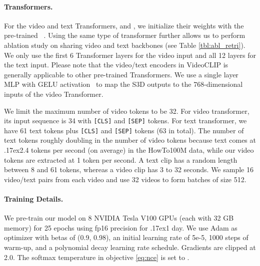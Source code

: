 \documentclass[11pt]{article}
\newcommand{\app}{\raise.17ex\hbox{}}
\begin{document}
\paragraph{Transformers.}
For the video and text Transformers,  and , we initialize their weights with the pre-trained ~\cite{devlin-etal-2019-bert}. Using the same type of transformer further allows us to perform ablation study on sharing video and text backbones (see Table \ref{tbl:abl_retri}).
We only use the first 6 Transformer layers for the video input and all 12 layers for the text input.
Please note that the video/text encoders in VideoCLIP is generally applicable to other pre-trained Transformers.
We use a single layer MLP  with GELU activation~\cite{hendrycks2016gaussian} to map the S3D outputs to the 768-dimensional inputs of the video Transformer.



We limit the maximum number of video tokens to be 32.
For video transformer, its input sequence is 34 with \texttt{[CLS]} and \texttt{[SEP]} tokens.
For text transformer, we have 61 text tokens plus \texttt{[CLS]} and \texttt{[SEP]} tokens (63 in total).
The number of text tokens roughly doubling in the number of video tokens because text comes at \app2.4 tokens per second (on average) in the HowTo100M data, while our video tokens are extracted at 1 token per second. 
A text clip has a random length between 8 and 61 tokens, whereas a video clip has 3 to 32 seconds.
We sample 16 video/text pairs from each video and use 32 videos to form batches of size 512.




\paragraph{Training Details.}
We pre-train our model on 8 NVIDIA Tesla V100 GPUs (each with 32 GB memory) for 25 epochs using fp16 precision for \app1 day.
We use Adam \cite{kingma2014adam} as optimizer with betas of (0.9, 0.98), an initial learning rate of 5e-5, 1000 steps of warm-up, and a polynomial decay learning rate schedule. 
Gradients are clipped at 2.0. The softmax temperature in objective \eqref{eq:nce} is set to . 
\end{document}
